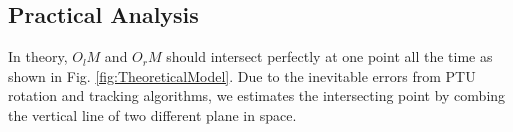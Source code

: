 %
%
%


\subsection{Practical Analysis}
In theory, $O_lM$ and $O_rM$ should intersect perfectly at one point all the time as shown in Fig. \ref{fig:TheoreticalModel}. Due to the inevitable errors from PTU rotation and tracking algorithms, we estimates the intersecting point by combing the vertical line of two different plane in space.

